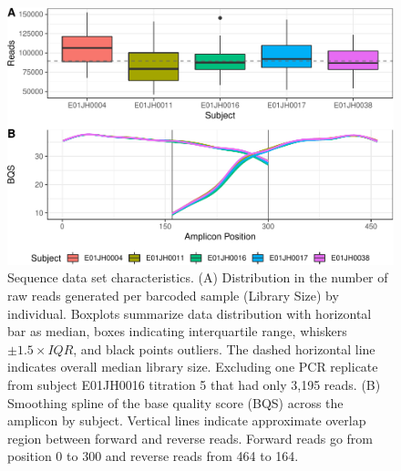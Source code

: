 \documentclass[12pt]{article}
\begin{document}
\begin{figure}
\centering
\includegraphics[width=0.9\linewidth]{qaPlots-1.pdf}
\caption{\label{fig:qaPlots}Sequence data set characteristics. (A)
Distribution in the number of raw reads generated per barcoded sample (Library Size)
by individual. Boxplots summarize data distribution with horizontal bar
as median, boxes indicating interquartile range, whiskers
\(\pm 1.5\times IQR\), and black points outliers. The dashed horizontal
line indicates overall median library size. Excluding one PCR replicate
from subject E01JH0016 titration 5 that had only 3,195 reads. (B)
Smoothing spline of the base quality score (BQS) across the amplicon by
subject. Vertical lines indicate approximate overlap region between
forward and reverse reads. Forward reads go from position 0 to 300 and
reverse reads from 464 to 164.
}
\end{figure}
\end{document}
